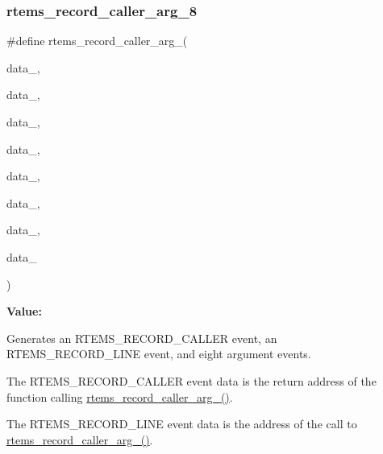 \subsubsection{\texorpdfstring{rtems\_record\_caller\_arg\_8}{rtems\_record\_caller\_arg\_8}}
{\footnotesize\ttfamily \#define rtems\+\_\+record\+\_\+caller\+\_\+arg\+\_(\begin{DoxyParamCaption}\item[{}]{data\+\_,  }\item[{}]{data\+\_,  }\item[{}]{data\+\_,  }\item[{}]{data\+\_,  }\item[{}]{data\+\_,  }\item[{}]{data\+\_,  }\item[{}]{data\+\_,  }\item[{}]{data\+\_ }\end{DoxyParamCaption})}

{\bfseries Value\+:}
\begin{DoxyCode}{0}
\DoxyCodeLine{  )}

\end{DoxyCode}


Generates an R\+T\+E\+M\+S\+\_\+\+R\+E\+C\+O\+R\+D\+\_\+\+C\+A\+L\+L\+ER event, an R\+T\+E\+M\+S\+\_\+\+R\+E\+C\+O\+R\+D\+\_\+\+L\+I\+NE event, and eight argument events. 

The R\+T\+E\+M\+S\+\_\+\+R\+E\+C\+O\+R\+D\+\_\+\+C\+A\+L\+L\+ER event data is the return address of the function calling \mbox{\hyperlink{group__RTEMSRecord_ga3a72a086d549c7ec22735317d36014bf}{rtems\+\_\+record\+\_\+caller\+\_\+arg\+\_()}}.

The R\+T\+E\+M\+S\+\_\+\+R\+E\+C\+O\+R\+D\+\_\+\+L\+I\+NE event data is the address of the call to \mbox{\hyperlink{group__RTEMSRecord_ga3a72a086d549c7ec22735317d36014bf}{rtems\+\_\+record\+\_\+caller\+\_\+arg\+\_()}}.


